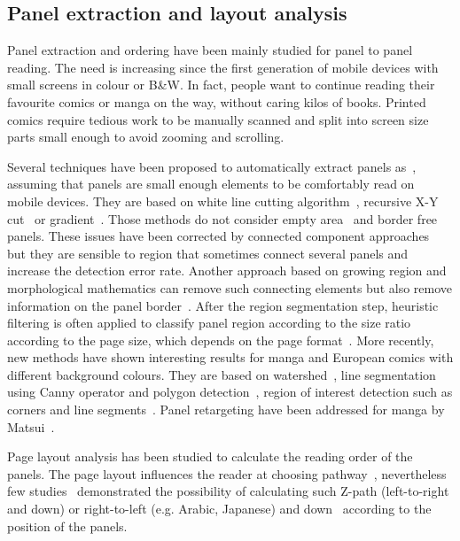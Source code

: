 \subsection{Panel extraction and layout analysis}
\label{sec:sota:layout_panel}


Panel extraction and ordering have been mainly studied for panel to panel reading.
The need is increasing since the first generation of mobile devices with small screens in colour or B\&W.
In fact, people want to continue reading their favourite comics or manga on the way, without caring kilos of books.
Printed comics require tedious work to be manually scanned and split into screen size parts small enough to avoid zooming and scrolling.

Several techniques have been proposed to automatically extract panels as~\cite{In11}, assuming that panels are small enough elements to be comfortably read on mobile devices.
They are based on white line cutting algorithm~\cite{Duda72,Luyuan2014Automatic,Chan2007Automatic}, recursive X-Y cut~\cite{Han07} or gradient~\cite{Tan07}.
Those methods do not consider empty area~\cite{In11} and border free panels.
These issues have been corrected by connected component approaches~\cite{Arai10} 
but they are sensible to region that sometimes connect several panels and increase the detection error rate.
Another approach based on growing region and morphological mathematics can remove such connecting elements but also remove information on the panel border~\cite{Ho2012}.
After the region segmentation step, heuristic filtering is often applied to classify panel region according to the size ratio according to the page size, which depends on the page format~\cite{Arai11,Ho2012}.
More recently, new methods have shown interesting results for manga and European comics with different background colours.
They are based on watershed~\cite{ponsard2012ocr}, line segmentation using Canny operator and polygon detection~\cite{Luyuan2014Automatic}, region of interest detection such as corners and line segments~\cite{stommel2012segmentation,Tsai2013Adaptive}.
Panel retargeting have been addressed for manga by Matsui~\cite{Matsui2011}.

Page layout analysis has been studied to calculate the reading order of the panels.
The page layout influences the reader at choosing pathway~\cite{Cohn_2013}, nevertheless few studies~\cite{Guerin2012Ontologies,Ponsard09,Arai2010Automatic} demonstrated the possibility of calculating such Z-path (left-to-right and down) or right-to-left (e.g. Arabic, Japanese) and down~\cite{Li2013Comic,Tsai2013Adaptive} according to the position of the panels. 

